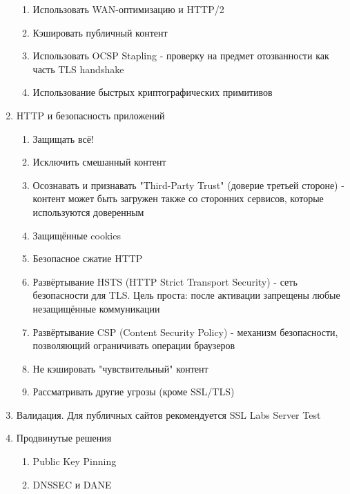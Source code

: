 \documentclass[a4paper]{article}
\begin{document}
\begin{enumerate}
\begin{enumerate}
	\item Использовать WAN-оптимизацию и HTTP/2
	
	\item Кэшировать публичный контент
	
	\item Использовать OCSP Stapling - проверку на предмет отозванности как часть TLS handshake
	
	\item Использование быстрых криптографических примитивов 
		
	\end{enumerate}
	
\item  HTTP и безопасность приложений

	\begin{enumerate}
	
	\item Защищать всё!
	
	\item Исключить смешанный контент
	
	\item Осознавать и признавать "Third-Party Trust" (доверие третьей стороне) - контент может быть загружен также со сторонних сервисов, которые используются доверенным
	
	\item Защищённые cookies
	
	\item Безопасное сжатие HTTP
	
	\item Развёртывание HSTS (HTTP Strict Transport Security) - сеть безопасности для TLS. Цель проста: после активации запрещены любые незащищённые коммуникации
	
	\item Развёртывание CSP (Content Security Policy) - механизм безопасности, позволяющий ограничивать операции браузеров
	
	\item Не кэшировать "чувствительный" контент
	
	\item Рассматривать другие угрозы (кроме SSL/TLS)
	
	\end{enumerate}
	
\item Валидация. Для публичных сайтов рекомендуется SSL Labs Server Test

\item Продвинутые решения

	\begin{enumerate}
	
	\item Public Key Pinning
	
	\item DNSSEC и DANE	
	
	\end{enumerate}

\end{enumerate}
\end{document}
